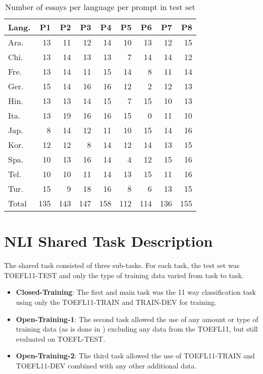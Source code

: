 \documentclass[11pt,letterpaper]{article}
\begin{document}
\begin{table*}[htb]
    \label{tab:prompts-test}
    \begin{center}
        \begin{tabular}{lrrrrrrrr}
            \hline
            \textbf{Lang.} & \textbf{P1} & \textbf{P2} & \textbf{P3} & \textbf{P4} & \textbf{P5} & \textbf{P6} & \textbf{P7} & \textbf{P8}\\ \hline
            Ara.     &   13 & 11 & 12 & 14 & 10 & 13 & 12 & 15 \\ \hline
            Chi.    &   13 & 14 & 13 & 13 & 7  & 14 & 14 & 12 \\ \hline
            Fre.     &   13 & 14 & 11 & 15 & 14 & 8  & 11 & 14 \\ \hline
            Ger.     &   15 & 14 & 16 & 16 & 12 & 2  & 12 & 13 \\ \hline
            Hin.      &   13 & 13 & 14 & 15 & 7  & 15 & 10 & 13 \\ \hline
            Ita.    &   13 & 19 & 16 & 16 & 15 & 0  & 11 & 10 \\ \hline
            Jap.   &   8  & 14 & 12 & 11 & 10 & 15 & 14 & 16 \\ \hline
            Kor.     &   12 & 12 & 8  & 14 & 12 & 14 & 13 & 15 \\ \hline
            Spa.    &   10 & 13 & 16 & 14 & 4  & 12 & 15 & 16 \\ \hline
            Tel.     &   10 & 10 & 11 & 14 & 13 & 15 & 11 & 16 \\ \hline
            Tur.    &   15 & 9  & 18 & 16 & 8  & 6  & 13 & 15 \\ \hline \hline
            Total      &   135&143 & 147& 158& 112& 114& 136& 155 \\ \hline
        \end{tabular}
    \end{center}
    \caption{Number of essays per language per prompt in test set}
\end{table*}


\section{NLI Shared Task Description}

The shared task consisted of three sub-tasks. For each task, the
test set was TOEFL11-TEST and only the type of training data varied from
task to task.

\begin{itemize}
\item {\bf Closed-Training}:  The first and main task was the 11 way
classification task using only the TOEFL11-TRAIN and TRAIN-DEV for training.
\item {\bf Open-Training-1}: The second task allowed the use of any amount or
type of training data (as is done in \cite{brooke2011native}) excluding any data from the TOEFL11, but still evaluated on
TOEFL-TEST.
\item {\bf Open-Training-2}: The third task allowed the use of TOEFL11-TRAIN and TOEFL11-DEV combined with any other additional data.
\end{itemize}
\end{document}
